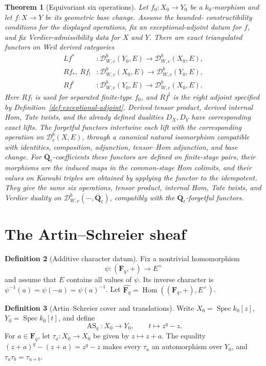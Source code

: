 \documentclass[10pt]{article}
\newtheorem{theorem}{Theorem}[section]
\theoremstyle{definition}
\newtheorem{definition}[theorem]{Definition}
\newcommand{\Fq}{\mathbf F_q}
\newcommand{\Qlb}{\overline{\mathbf Q}_\ell}
\newcommand{\Dbc}{\mathcal D^b_c}
\newcommand{\Spec}{\operatorname{Spec}}
\begin{document}
\begin{theorem}[Equivariant six operations]
Let \(f_0:X_0\to Y_0\) be a \(k_0\)-morphism and let
\(f:X\to Y\) be its geometric base change.  Assume the bounded-
constructibility conditions for the displayed operations, fix an
exceptional-adjoint datum for \(f\), and fix Verdier-admissibility data for
\(X\) and \(Y\).  There are exact triangulated functors on Weil derived
categories
\[
 \begin{aligned}
 Lf^*&:\mathcal D^b_{W,c}(Y_0,E)
       \longrightarrow\mathcal D^b_{W,c}(X_0,E),\\
 Rf_*,\ Rf_!&:\mathcal D^b_{W,c}(X_0,E)
       \longrightarrow\mathcal D^b_{W,c}(Y_0,E),\\
 Rf^!&:\mathcal D^b_{W,c}(Y_0,E)
       \longrightarrow\mathcal D^b_{W,c}(X_0,E).
 \end{aligned}
\]
Here \(Rf_!\) is used for separated finite-type \(f_0\), and \(Rf^!\) is the
right adjoint specified by Definition~\ref{def:exceptional-adjoint}.
Derived tensor product, derived internal Hom, Tate twists, and the already
defined dualities \(D_X,D_Y\) have corresponding exact lifts.  The
forgetful functors intertwine
each lift with the corresponding operation on \(\Dbc(X,E)\), through a
canonical natural isomorphism compatible with identities, composition,
adjunction, tensor--Hom adjunction, and base change.
For \(\Qlb\)-coefficients these functors are defined on finite-stage pairs,
their morphisms are the induced maps in the common-stage Hom colimits, and
their values on Karoubi triples are obtained by applying the functor to the
idempotent.  They give the same six operations, tensor product, internal
Hom, Tate twists, and Verdier duality on
\(\mathcal D^b_{W,c}(-,\Qlb)\), compatibly with the \(\Qlb\)-forgetful
functors.
\end{theorem}

\section{The Artin--Schreier sheaf}

\begin{definition}[Additive character datum]
Fix a nontrivial homomorphism
\[
  \psi:(\Fq,+)\longrightarrow E^\times
\]
and assume that \(E\) contains all values of \(\psi\).  Its inverse
character is
\(\psi^{-1}(a)=\psi(-a)=\psi(a)^{-1}\).  Let
\(\widehat{\Fq}=\operatorname{Hom}((\Fq,+),E^\times)\).
\end{definition}

\begin{definition}[Artin--Schreier cover and translations]
Write \(X_0=\Spec k_0[z]\), \(Y_0=\Spec k_0[t]\), and define
\[
 \operatorname{AS}_q:X_0\longrightarrow Y_0,
 \qquad t\longmapsto z^q-z.
\]
For \(a\in\Fq\), let \(\tau_a:X_0\to X_0\) be given by
\(z\mapsto z+a\).  The equality
\((z+a)^q-(z+a)=z^q-z\) makes every \(\tau_a\) an automorphism over
\(Y_0\), and \(\tau_a\tau_b=\tau_{a+b}\).
\end{definition}
\end{document}
